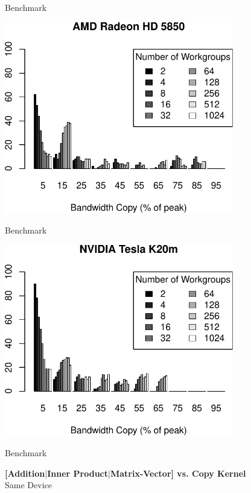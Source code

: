 \begin{frame}{Benchmark}
  \begin{center} \includegraphics[width=0.75\textwidth]{figures/hd5850_double_hist_wgroups_dot} \end{center}
\end{frame}

\begin{frame}{Benchmark}
  \begin{center} \includegraphics[width=0.75\textwidth]{figures/k20m_double_hist_wgroups_dot} \end{center}
\end{frame}





\begin{frame}{Benchmark}
  \begin{center} \textbf{ [Addition$|$Inner Product$|$Matrix-Vector] vs. Copy Kernel }\\[1em] Same Device \end{center}
\end{frame}

